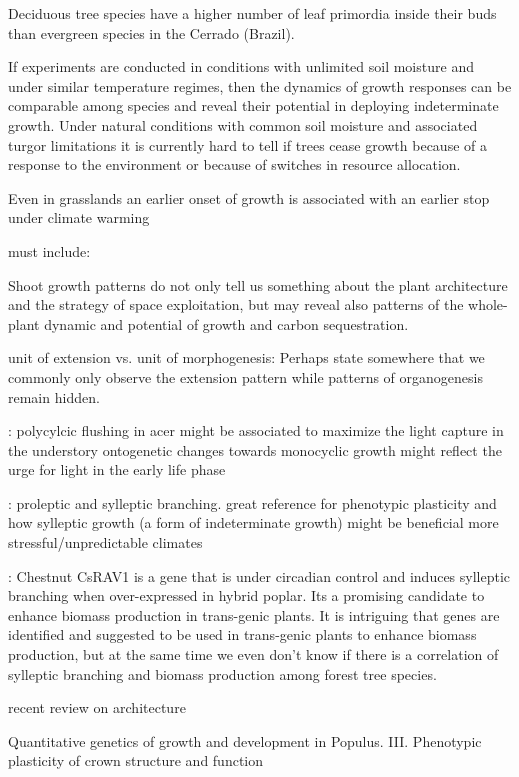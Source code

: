 \documentclass{article}
\begin{document}
Deciduous tree species have a higher number of leaf primordia inside their buds than evergreen species in the Cerrado (Brazil). 
	
If experiments are conducted in conditions with unlimited soil moisture and under similar temperature regimes, then the dynamics of growth responses can be comparable among species and reveal their potential in deploying indeterminate growth. Under natural conditions with common soil moisture and associated turgor limitations it is currently hard to tell if trees cease growth because of a response to the environment or because of switches in resource allocation. 
 
 Even in grasslands an earlier onset of growth is associated with an earlier stop under climate warming \cite{mohlGrowthAlpineGrassland2022a}
	
	
	must include: 
	
	\cite{iwasaOptimalGrowthSchedule1989}
	
	
	
	Shoot growth patterns do not only tell us something about the plant architecture and the strategy of space exploitation, but may reveal also patterns of the whole-plant dynamic and potential of growth and carbon sequestration.
	
	unit of extension vs. unit of morphogenesis: Perhaps state somewhere that we commonly only observe the extension pattern while patterns of organogenesis remain hidden. 
	
	\citep{verduEvolutionaryCorrelationsPolycyclic2007}: polycylcic flushing in acer might be associated to maximize the light capture in the understory
	ontogenetic changes towards monocyclic growth might reflect the urge for light in the early life phase
	
	 \citep{wuPhenotypicPlasticitySylleptic2001}: proleptic and sylleptic branching. great reference for phenotypic plasticity and how sylleptic growth (a form of indeterminate growth) might be beneficial more stressful/unpredictable climates
	
	\citep{moreno-cortesCsRAV1InducesSylleptic2012}: Chestnut CsRAV1 is a gene that is under circadian control and induces sylleptic branching when over-expressed in hybrid poplar. Its a promising candidate to enhance biomass production in trans-genic plants. It is intriguing that genes are identified and suggested to be used in trans-genic plants to enhance biomass production, but at the same time we even don't know if there is a correlation of sylleptic branching and biomass production among forest tree species.
	
	\citep{hollenderMolecularBasisAngiosperm2015} recent review on architecture
	
	\citep{wuQuantitativeGeneticsGrowth1998}Quantitative genetics of growth and development in Populus. III. Phenotypic plasticity of crown structure and function
	
	\newpage
	
	
	
	
	
	
\end{document}
